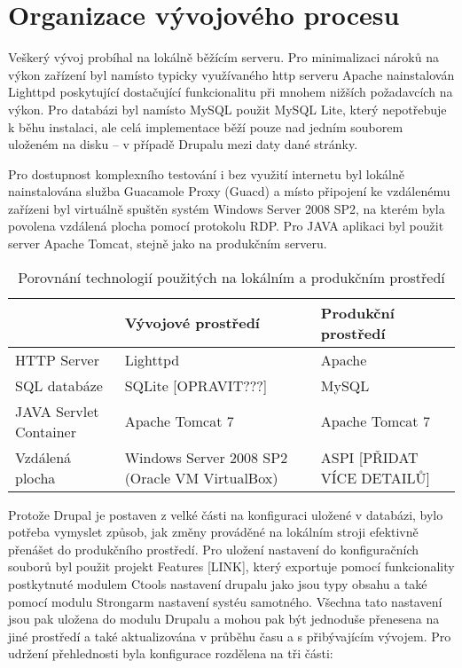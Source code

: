 \chapter{Organizace vývojového procesu}
\label{chap:vyvoj}

Veškerý vývoj probíhal na lokálně běžícím serveru. Pro minimalizaci nároků na výkon zařízení byl namísto typicky využívaného http serveru Apache nainstalován Lighttpd poskytující dostačující funkcionalitu při mnohem nižších požadavcích na výkon. Pro databázi byl namísto MySQL použit MySQL Lite, který nepotřebuje k běhu instalaci, ale celá implementace běží pouze nad jedním souborem uloženém na disku – v případě Drupalu mezi daty dané stránky. 

Pro dostupnost komplexního testování i bez využití internetu byl lokálně nainstalována služba Guacamole Proxy (Guacd) a místo připojení ke vzdálenému zařízeni byl virtuálně spuštěn systém Windows Server 2008 SP2, na kterém byla povolena vzdálená plocha pomocí protokolu RDP. Pro JAVA aplikaci byl použit server Apache Tomcat, stejně jako na produkčním serveru.

\begin{table}
  \caption{Porovnání technologií použitých na lokálním a produkčním prostředí}
  \begin{tabular}{ | p{3cm} | p{4cm} | p{4cm} | }
    \hline  
    & Vývojové prostředí & Produkční prostředí \\ \hline
    HTTP Server & Lighttpd & Apache \\ \hline
    SQL databáze & SQLite [OPRAVIT???] & MySQL \\ \hline
    JAVA Servlet Container & Apache Tomcat 7 & Apache Tomcat 7 \\ \hline
    Vzdálená plocha & Windows Server 2008 SP2 (Oracle VM VirtualBox) & ASPI [PŘIDAT VÍCE DETAILŮ] \\ \hline
  \end{tabular}
\end{table}

Protože Drupal je postaven z velké části na konfiguraci uložené v databázi, bylo potřeba vymyslet způsob, jak změny prováděné na lokálním stroji efektivně přenášet do produkčního prostředí. Pro uložení nastavení do konfiguračních souborů byl použit projekt Features [LINK], který exportuje pomocí funkcionality postkytnuté modulem Ctools nastavení drupalu jako jsou typy obsahu a také pomocí modulu Strongarm nastavení systéu samotného. Všechna tato nastavení jsou pak uložena do modulu Drupalu a mohou pak být jednoduše přenesena na jiné prostředí a také aktualizována v průběhu času a s přibývajícím vývojem. Pro udržení přehlednosti byla konfigurace rozdělena na tři části:

